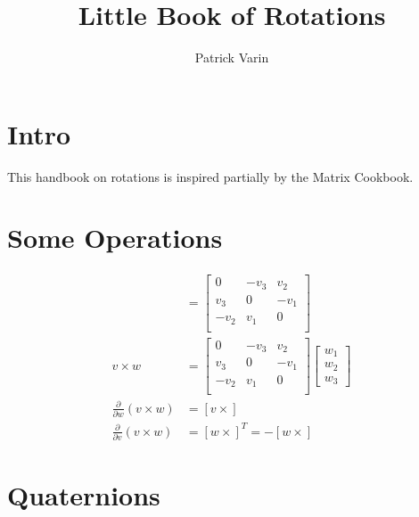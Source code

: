 \documentclass[11pt]{article}
\title{Little Book of Rotations}
\author{Patrick Varin}
\begin{document}
\maketitle
\section{Intro}
This handbook on rotations is inspired partially by the Matrix Cookbook\cite{petersen2008matrix}.
\section{Some Operations}
\begin{align}
	[v\times] &=
	\begin{bmatrix}
          0 & -v_3 &  v_2\\
        v_3 &    0 & -v_1\\
       -v_2 &  v_1 &    0\\
	\end{bmatrix}\\
	v\times w &=
	\begin{bmatrix}
          0 & -v_3 &  v_2\\
        v_3 &    0 & -v_1\\
       -v_2 &  v_1 &    0\\
	\end{bmatrix}
	\begin{bmatrix}
		w_1\\
		w_2\\
		w_3
	\end{bmatrix}\\
	\frac{\partial}{\partial w}(v\times w) &= [v\times]\\
	\frac{\partial}{\partial v}(v\times w) &= [w\times]^T = -[w\times]
\end{align}
\section{Quaternions}
\end{document}
